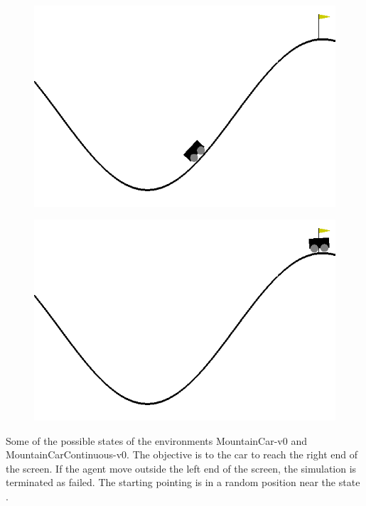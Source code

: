 \documentclass[conference]{IEEEtran}
\begin{document}
\begin{table}[t]
\begin{minipage}{0.45\linewidth}
\begin{subfigure}{0.5\linewidth}
            \caption{}
            \label{MountainCar-0 states:b}
        \end{subfigure}
        \begin{subfigure}{0.5\linewidth}
            \centering
            \includegraphics[width=0.9\linewidth]{img/MountainCar-2.png}
            \caption{}
            \label{MountainCar-0 states:c}
        \end{subfigure}%
        \begin{subfigure}{0.5\linewidth}
            \centering
            \includegraphics[width=0.9\linewidth]{img/MountainCar-3.png}
            \caption{}
            \label{MountainCar-0 states:d}
        \end{subfigure}
        \caption{Some of the possible states of the environments MountainCar-v0 and MountainCarContinuous-v0. The objective is to the car to reach the right end of the screen. If the agent move outside the left end of the screen, the simulation is terminated as failed. The starting pointing is in a random position near the state .}
        \label{MountainCar-0 states}
    \end{minipage}
\end{table}
\end{document}
